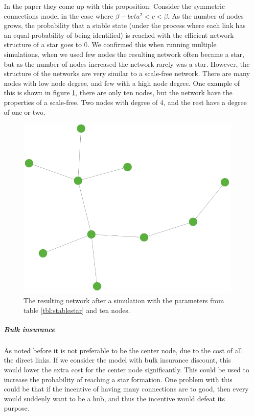 In the paper \cite{jackson2005survey} they come up with this proposition:
Consider the symmetric connections model in the case where $\beta-beta^2<c<\beta$. As the number of nodes grows, the probability that a stable state (under the
process where each link has an equal probability of being identified) is reached with the
efficient network structure of a star goes to 0.
We confirmed this when running multiple simulations, when we used few nodes the resulting network often became a star, but as the number of nodes increased the network rarely was a star.
However, the structure of the networks are very similar to a scale-free network. There are many nodes with low node degree, and few with a high node degree.
One example of this is shown in figure \ref{fig:stablescalefree}, there are only ten nodes, but the network have the properties of a scale-free. Two nodes with degree of 4, and the rest have a degree of one or two.
\begin{figure}[h]
\centering
  \includegraphics[width=0.5\linewidth]{../Figures/stability/Unefficientbutstabletwo.png}
  \caption{\label{fig:stablescalefree} The resulting network after a simulation with the parameters from table \ref{tbl:stablestar} and ten nodes.}
\end{figure}
\subparagraph{Bulk insurance}
As noted before it is not preferable to be the center node, due to the cost of all the direct links. If we consider the model with bulk insurance discount, this would lower the extra cost for the center node significantly. This could be used to increase the probability of reaching a star formation. One problem with this could be that if the incentive of having many connections are to good, then every would suddenly want to be a hub, and thus the incentive would defeat its purpose. 

